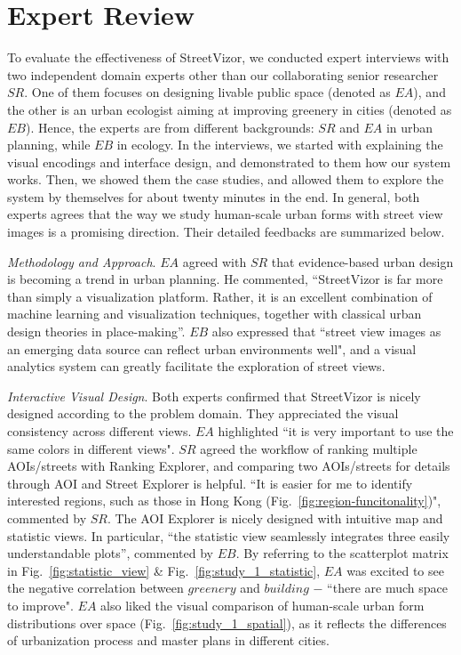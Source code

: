 \section{Expert Review}

To evaluate the effectiveness of StreetVizor, we conducted expert interviews with two independent domain experts other than our collaborating senior researcher $SR$.
One of them focuses on designing livable public space (denoted as $EA$), and the other is an urban ecologist aiming at improving greenery in cities (denoted as $EB$).
Hence, the experts are from different backgrounds: $SR$ and $EA$ in urban planning, while $EB$ in ecology.
In the interviews, we started with explaining the visual encodings and interface design, and demonstrated to them how our system works.
Then, we showed them the case studies, and allowed them to explore the system by themselves for about twenty minutes in the end.
In general, both experts agrees that the way we study human-scale urban forms with street view images is a promising direction.
Their detailed feedbacks are summarized below.

\vspace*{2mm}
\noindent
\textit{Methodology and Approach}.
$EA$ agreed with $SR$ that evidence-based urban design is becoming a trend in urban planning.
He commented, ``StreetVizor is far more than simply a visualization platform. 
Rather, it is an excellent combination of machine learning and visualization techniques, together with classical urban design theories in place-making''.
$EB$ also expressed that ``street view images as an emerging data source can reflect urban environments well", and a visual analytics system can greatly facilitate the exploration of street views.

\vspace*{2mm}
\noindent
\textit{Interactive Visual Design}.
Both experts confirmed that StreetVizor is nicely designed according to the problem domain.
They appreciated the visual consistency across different views.
$EA$ highlighted ``it is very important to use the same colors in different views". 
$SR$ agreed the workflow of ranking multiple AOIs/streets with Ranking Explorer, and comparing two AOIs/streets for details through AOI and Street Explorer is helpful.
``It is easier for me to identify interested regions, such as those in Hong Kong (Fig.~\ref{fig:region-funcitonality})", commented by $SR$.
The AOI Explorer is nicely designed with intuitive map and statistic views.
In particular, ``the statistic view seamlessly integrates three easily understandable plots'', commented by $EB$.
By referring to the scatterplot matrix in Fig.~\ref{fig:statistic_view} \& Fig.~\ref{fig:study_1_statistic}, $EA$ was excited to see the negative correlation between $greenery$ and $building$ $-$ ``there are much space to improve".
$EA$ also liked the visual comparison of human-scale urban form distributions over space (Fig.~\ref{fig:study_1_spatial}), as it reflects the differences of urbanization process and master plans in different cities.

